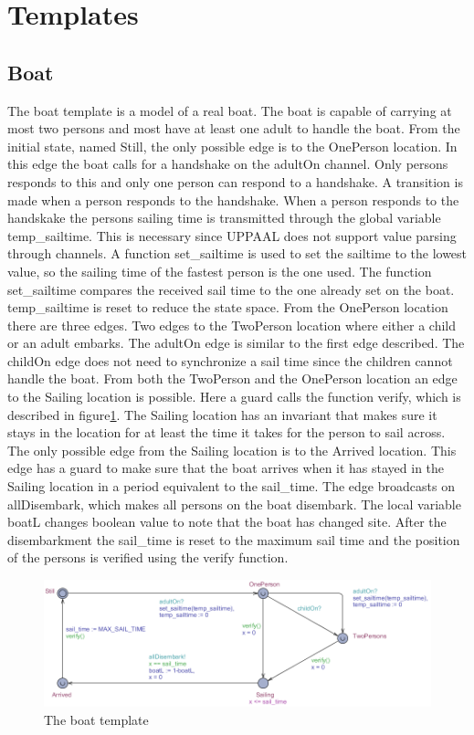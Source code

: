 \section{Templates}




\subsection{Boat}
The boat template is a model of a real boat. 
The boat is capable of carrying at most two persons and most have at least one adult to handle the boat. 
From the initial state, named Still, the only possible edge is to the OnePerson location. 
In this edge the boat calls for a handshake on the adultOn channel. 
Only persons responds to this and only one person can respond to a handshake.
A transition is made when a person responds to the handshake.  
When a person responds to the handskake the persons sailing time is transmitted through the global variable temp\_sailtime. 
This is necessary since UPPAAL does not support value parsing through channels. 
A function set\_sailtime is used to set the sailtime to the lowest value, so the sailing time of the fastest person is the one used. 
The function set\_sailtime compares the received sail time to the one already set on the boat. 
temp\_sailtime is reset to reduce the state space.
From the OnePerson location there are three edges. 
Two edges to the TwoPerson location where either a child or an adult embarks. 
The adultOn edge is similar to the first edge described. 
The childOn edge does not need to synchronize a sail time since the children cannot handle the boat. 
From both the TwoPerson and the OnePerson location an edge to the Sailing location is possible. 
Here a guard calls the function verify, which is described in figure\ref{fig:boat}. 
The Sailing location has an invariant that makes sure it stays in the location for at least the time it takes for the person to sail across. 
The only possible edge from the Sailing location is to the Arrived location. 
This edge has a guard to make sure that the boat arrives when it has stayed in the Sailing location in a period equivalent to the sail\_time. 
The edge broadcasts on allDisembark, which makes all persons on the boat disembark. 
The local variable boatL changes boolean value to note that the boat has changed site. 
After the disembarkment the sail\_time is reset to the maximum sail time and the position of the persons is verified using the verify function. 
\begin{figure}%
\includegraphics[width=\columnwidth]{pictures/boat.png}%
\caption{The boat template}%
\label{fig:boat}%
\end{figure}
